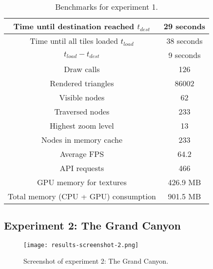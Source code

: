 \begin{table}[H]
  \begin{center}
    \begin{tabular}{ c|c }
      Time until destination reached $t_{dest}$ & 29 seconds \\
      \hline
      Time until all tiles loaded $t_{load}$ & 38 seconds\\
      \hline
      $t_{load} - t_{dest}$ & 9 seconds \\
      \hline
      Draw calls & 126 \\
      \hline
      Rendered triangles & 86002 \\
      \hline
      Visible nodes & 62 \\
      \hline
      Traversed nodes & 233 \\
      \hline
      Highest zoom level & 13 \\
      \hline
      Nodes in memory cache & 233 \\
      \hline
      Average FPS & 64.2 \\
      \hline 
      API requests & 466 \\
      \hline
      GPU memory for textures &  426.9 MB\\
      \hline
      Total memory (CPU + GPU) consumption & 901.5 MB \\
    \end{tabular}
  \end{center}
  \caption{Benchmarks for experiment 1.}\label{tbl:results-1}
  \end{table}

\subsection{Experiment 2: The Grand Canyon}
\begin{figure}[H]
  \centering
  \texttt{[image: results-screenshot-2.png]}
  \caption{Screenshot of experiment 2: The Grand Canyon.}\label{fig:results-screenshot-2}
\end{figure}

